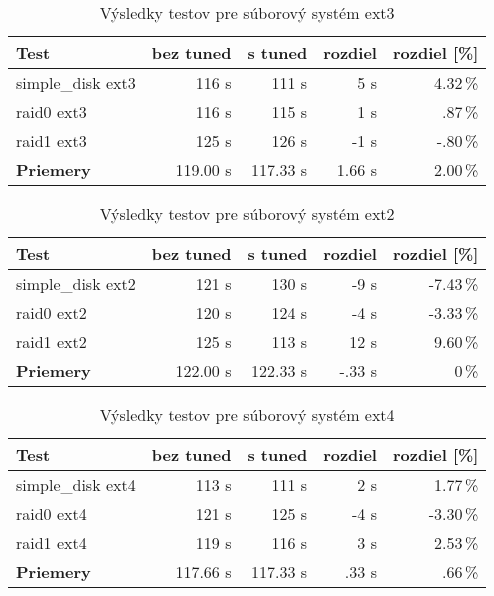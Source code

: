 \begin{table}[H]
\begin{center}
\begin{tabular}{|l|r|r|r|r|}
    \hline
    \textbf{Test} & \textbf{bez tuned} & \textbf{s tuned} & \textbf{rozdiel} & \textbf{rozdiel [\%]} \\ \hline
    simple\_disk ext3 & 116 s & 111 s & 5 s & 4.32\,\% \\
    \hline
    raid0 ext3 & 116 s & 115 s & 1 s & .87\,\% \\
    \hline
    raid1 ext3 & 125 s & 126 s & -1 s & -.80\,\% \\
    \hline
    \textbf{Priemery} & 119.00 s & 117.33 s & 1.66 s & 2.00\,\% \\
    \hline
\end{tabular}
\caption{Výsledky testov pre súborový systém ext3}
\label{tab:results-ext3}
\end{center}
\end{table}

\begin{table}[H]
\begin{center}
\begin{tabular}{|l|r|r|r|r|}
    \hline
    \textbf{Test} & \textbf{bez tuned} & \textbf{s tuned} & \textbf{rozdiel} & \textbf{rozdiel [\%]} \\ \hline
    simple\_disk ext2 & 121 s & 130 s & -9 s & -7.43\,\% \\
    \hline
    raid0 ext2 & 120 s & 124 s & -4 s & -3.33\,\% \\
    \hline
    raid1 ext2 & 125 s & 113 s & 12 s & 9.60\,\% \\
    \hline
    \textbf{Priemery} & 122.00 s & 122.33 s & -.33 s & 0\,\% \\
    \hline
\end{tabular}
\caption{Výsledky testov pre súborový systém ext2}
\label{tab:results-ext2}
\end{center}
\end{table}

\begin{table}[H]
\begin{center}
\begin{tabular}{|l|r|r|r|r|}
    \hline
    \textbf{Test} & \textbf{bez tuned} & \textbf{s tuned} & \textbf{rozdiel} & \textbf{rozdiel [\%]} \\ \hline
    simple\_disk ext4 & 113 s & 111 s & 2 s & 1.77\,\% \\
    \hline
    raid0 ext4 & 121 s & 125 s & -4 s & -3.30\,\% \\
    \hline
    raid1 ext4 & 119 s & 116 s & 3 s & 2.53\,\% \\
    \hline
    \textbf{Priemery} & 117.66 s & 117.33 s & .33 s & .66\,\% \\
    \hline
\end{tabular}
\caption{Výsledky testov pre súborový systém ext4}
\label{tab:results-ext4}
\end{center}
\end{table}

